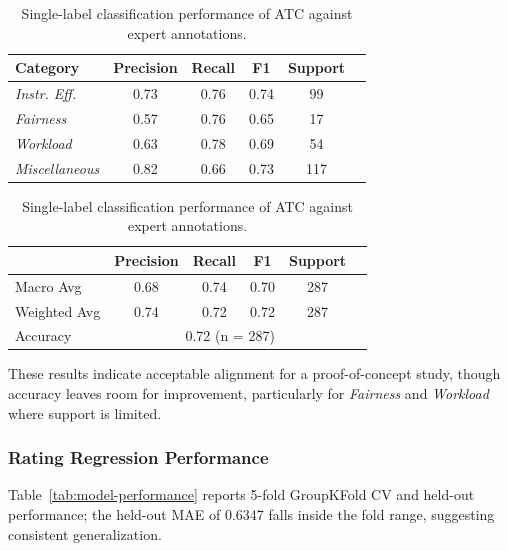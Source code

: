 \documentclass[fleqn,10pt]{JLA_article}
\begin{document}
\begin{table}[htbp]
    \caption{Single-label classification performance of ATC against expert annotations.}
    \label{tab:atc-classification-report}

    \centering
    \begin{minipage}[t]{0.48\linewidth}
        \centering
        \small
        \begin{tabular*}{\linewidth}{@{\extracolsep{\fill}}lccccc@{}}
        \textbf{Category} & \textbf{Precision} & \textbf{Recall} & \textbf{F1} & \textbf{Support} \\
        \hline
        \textit{Instr. Eff.} & 0.73 & 0.76 & 0.74 & 99 \\
        \textit{Fairness} & 0.57 & 0.76 & 0.65 & 17 \\
        \textit{Workload} & 0.63 & 0.78 & 0.69 & 54 \\
        \textit{Miscellaneous} & 0.82 & 0.66 & 0.73 & 117 \\
        \hline
        \end{tabular*}
    \end{minipage}\hfill
    \begin{minipage}[t]{0.48\linewidth}
        \centering
        \small
        \begin{tabular*}{\linewidth}{@{\extracolsep{\fill}}lccccc@{}}
         & \textbf{Precision} & \textbf{Recall} & \textbf{F1} & \textbf{Support} \\
        \hline
        Macro Avg & 0.68 & 0.74 & 0.70 & 287 \\
        Weighted Avg & 0.74 & 0.72 & 0.72 & 287 \\
        \hline
        Accuracy & \multicolumn{4}{c}{0.72 (n = 287)} \\
        \hline
        \end{tabular*}
    \end{minipage}
\end{table}

These results indicate acceptable alignment for a proof-of-concept study, though accuracy leaves room for improvement, particularly for \textit{Fairness} and \textit{Workload} where support is limited.

\subsubsection{Rating Regression Performance}

Table~\ref{tab:model-performance} reports 5-fold GroupKFold CV and held-out performance; the held-out MAE of 0.6347 falls inside the fold range, suggesting consistent generalization.
\end{document}
